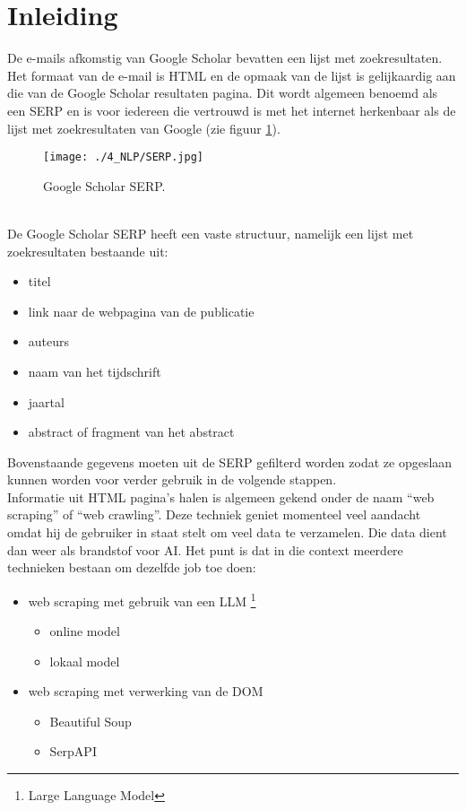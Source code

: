 \section{Inleiding}
De e-mails afkomstig van Google Scholar bevatten een lijst met zoekresultaten. Het formaat van de e-mail is HTML en de opmaak van de lijst is gelijkaardig aan die van de Google Scholar resultaten pagina. Dit wordt algemeen benoemd als een SERP en is voor iedereen die vertrouwd is met het internet herkenbaar als de lijst met zoekresultaten van Google (zie figuur \ref{fig:Google_Scholar_SERP}).
\begin{figure}
    \centering
    \texttt{[image: ./4\_NLP/SERP.jpg]}
    \caption[Google Scholar SERP.]{\label{fig:Google_Scholar_SERP}Google Scholar SERP.}
\end{figure}\\
De Google Scholar SERP heeft een vaste structuur, namelijk een lijst met zoekresultaten bestaande uit:
\begin{itemize}
    \item titel
    \item link naar de webpagina van de publicatie
    \item auteurs
    \item naam van het tijdschrift
    \item jaartal
    \item abstract of fragment van het abstract
\end{itemize} 
Bovenstaande gegevens moeten uit de SERP gefilterd worden zodat ze opgeslaan kunnen worden voor verder gebruik in de volgende stappen.\\
Informatie uit HTML pagina's halen is algemeen gekend onder de naam ``web scraping'' of  ``web crawling''. Deze techniek geniet momenteel veel aandacht omdat hij de gebruiker in staat stelt om veel data te verzamelen. Die data dient dan weer als brandstof voor AI. Het punt is dat in die context meerdere technieken bestaan om dezelfde job toe doen:
\begin{itemize}
    \item web scraping met gebruik van een LLM \footnote{Large Language Model}
    \begin{itemize}
        \item online model
        \item lokaal model
    \end{itemize}
    \item web scraping met verwerking van de DOM
    \begin{itemize}
        \item Beautiful Soup
        \item SerpAPI
    \end{itemize}
\end{itemize} 

